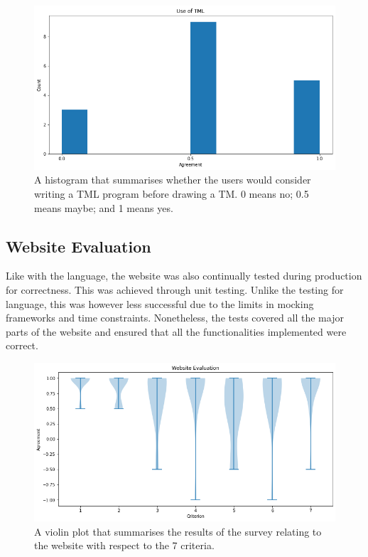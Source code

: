 
\begin{figure}
    \centering
    \includegraphics[scale=0.35]{data/use-tml.png}
    \caption{A histogram that summarises whether the users would consider writing a TML program before drawing a TM. 0 means no; 0.5 means maybe; and 1 means yes.}
    \label{fig:use-tml}
\end{figure}

\subsection{Website Evaluation}
Like with the language, the website was also continually tested during production for correctness. This was achieved through unit testing. Unlike the testing for language, this was however less successful due to the limits in mocking frameworks and time constraints. Nonetheless, the tests covered all the major parts of the website and ensured that all the functionalities implemented were correct.

\begin{figure}
    \centering
    \includegraphics[scale=0.35]{data/website-evaluation.png}
    \caption{A violin plot that summarises the results of the survey relating to the website with respect to the 7 criteria.}
    \label{fig:website-evaluation}
\end{figure}

